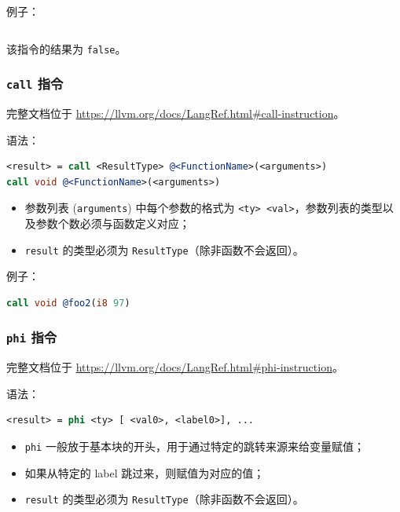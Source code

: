 例子：
\begin{lstlisting}[language=llvm]
%result = icmp eq i32 4, 5
\end{lstlisting}

该指令的结果为 \texttt{false}。

\subsubsection{\texttt{call} 指令}\label{LLVM-call-instructions}

\begin{remark}
完整文档位于 \url{https://llvm.org/docs/LangRef.html\#call-instruction}。
\end{remark}

语法：
\begin{lstlisting}[language=llvm]
<result> = call <ResultType> @<FunctionName>(<arguments>)
call void @<FunctionName>(<arguments>)
\end{lstlisting}

\begin{itemize}
  \item 参数列表 (\texttt{arguments}) 中每个参数的格式为
    \texttt{<ty> <val>}，参数列表的类型以及参数个数必须与函数定义对应；
  \item \texttt{result} 的类型必须为 \texttt{ResultType}（除非函数不会返回）。
\end{itemize}

例子：
\begin{lstlisting}[language=llvm]
%result = call i32 @foo1(i32 %arg1)
call void @foo2(i8 97)
\end{lstlisting}

\subsubsection{\texttt{phi} 指令}\label{LLVM-phi-instructions}

\begin{remark}
完整文档位于 \url{https://llvm.org/docs/LangRef.html\#phi-instruction}。
\end{remark}

语法：
\begin{lstlisting}[language=llvm]
<result> = phi <ty> [ <val0>, <label0>], ...
\end{lstlisting}

\begin{itemize}
  \item \texttt{phi} 一般放于基本块的开头，用于通过特定的跳转来源来给变量赋值；
  \item 如果从特定的 label 跳过来，则赋值为对应的值；
  \item \texttt{result} 的类型必须为 \texttt{ResultType}（除非函数不会返回）。
\end{itemize}

